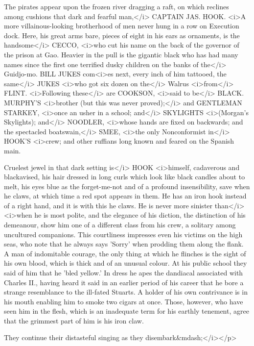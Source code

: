 \begin{stagedir}
The pirates appear upon the frozen river dragging a raft, on which reclines among cushions that dark and fearful man,</i> CAPTAIN JAS. HOOK. <i>A more villainous-looking brotherhood of men never hung in a row on Execution dock. Here, his great arms bare, pieces of eight in his ears as ornaments, is the handsome</i> CECCO, <i>who cut his name on the back of the governor of the prison at Gao. Heavier in the pull is the gigantic black who has had many names since the first one terrified dusky children on the banks of the</i> Guidjo-mo. BILL JUKES com<i>es next, every inch of him tattooed, the same</i> JUKES <i>who got six dozen on the</i> Walrus <i>from</i> FLINT. <i>Following these</i> are COOKSON, <i>said to be</i> BLACK. MURPHY'S <i>brother (but this was never proved);</i> and GENTLEMAN STARKEY, <i>once an usher in a school; and</i> SKYLIGHTS <i>(Morgan's Skylights); and</i> NOODLER, <i>whose hands are fixed on backwards; and the spectacled boatswain,</i> SMEE, <i>the only Nonconformist in</i> HOOK'S <i>crew; and other ruffians long known and feared on the Spanish main.

Cruelest jewel in that dark setting is</i> HOOK <i>himself, cadaverous and blackavised, his hair dressed in long curls which look like black candles about to melt, his eyes blue as the forget-me-not and of a profound insensibility, save when he claws, at which time a red spot appears in them. He has an iron hook instead of a right hand, and it is with this he claws. He is never more sinister than</i> <i>when he is most polite, and the elegance of his diction, the distinction of his demeanour, show him one of a different class from his crew, a solitary among uncultured companions. This courtliness impresses even his victims on the high seas, who note that he always says 'Sorry' when prodding them along the flank. A man of indomitable courage, the only thing at which he flinches is the sight of his own blood, which is thick and of an unusual colour. At his public school they said of him that he 'bled yellow.' In dress he apes the dandiacal associated with Charles II., having heard it said in an earlier period of his career that he bore a strange resemblance to the ill-fated Stuarts. A holder of his own contrivance is in his mouth enabling him to smoke two cigars at once. Those, however, who have seen him in the flesh, which is an inadequate term for his earthly tenement, agree that the grimmest part of him is his iron claw.

They continue their distasteful singing as they disembark&mdash;</i></p>
\end{stagedir}

